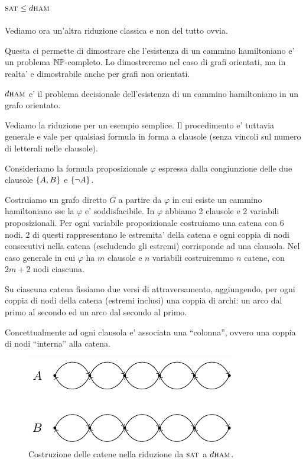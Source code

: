 \subsection{$\textsc{sat} \leq d\textsc{ham}$}

Vediamo ora un'altra riduzione classica e non del tutto ovvia.

Questa ci permette di dimostrare che l'esistenza di un cammino hamiltoniano e' un problema
$\mathbb{NP}$-completo. Lo dimostreremo nel caso di grafi orientati, ma in realta' e dimostrabile anche
per grafi non orientati.

$d\textsc{ham}$ e' il problema decisionale dell'esistenza di un cammino hamiltoniano in un grafo orientato.

Vediamo la riduzione per un esempio semplice. Il procedimento e' tuttavia generale e vale per
qualsiasi formula in forma a clausole (senza vincoli sul numero di letterali nelle clausole).

Consideriamo la formula proposizionale $\varphi$ espressa dalla congiunzione delle due clausole
$\left\{A,B\right\}$ e $\left\{\lnot A\right\}$.

Costruiamo un grafo diretto $G$ a partire da $\varphi$ in cui esiste un cammino hamiltoniano sse la
$\varphi$ e' soddisfacibile. In $\varphi$ abbiamo 2 clausole e 2 variabili proposizionali. Per ogni
variabile proposizionale costruiamo una catena con 6 nodi. 2 di questi rappresentano le estremita'
della catena e ogni coppia di nodi consecutivi nella catena (escludendo gli estremi) corrisponde ad
una clausola.  Nel caso generale in cui $\varphi$ ha $m$ clausole e $n$ variabili costruiremmo $n$
catene, con $2m + 2$ nodi ciascuna. 

Su ciascuna catena fissiamo due versi di attraversamento, aggiungendo, per ogni coppia di nodi della
catena (estremi inclusi) una coppia di archi: un arco dal primo al secondo ed un arco dal secondo al
primo.

Concettualmente ad ogni clausola e' associata una ``colonna'', ovvero una coppia di nodi ``interna''
alla catena.

\begin{figure}[h]
    \begin{center}
        \includegraphics{./img/NPClass/SATdHAM1.pdf}
        \caption{Costruzione delle catene nella riduzione da $\textsc{sat}$ a $d\textsc{ham}$.}
    \end{center}
\end{figure}


